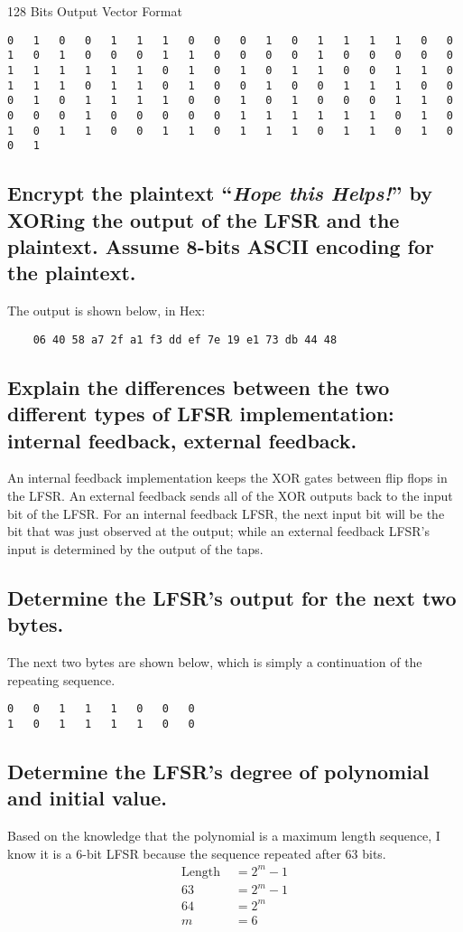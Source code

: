 \documentclass{article}
\begin{document}
\begin{table}[H]
   \centering
   \caption{128 Bits Output Vector Format}
   \begin{verbatim}
0	1	0	0	1	1	1	0	0	0	1	0	1	1	1	1	0	0	1	0	1	0	0	0	1	1	0	0	0	0	1	0	0	0	0	0	1	1	1	1	1	1	0	1	0	1	0	1	1	0	0	1	1	0	1	1	1	0	1	1	0	1	0	0	1	0	0	1	1	1	0	0	0	1	0	1	1	1	1	0	0	1	0	1	0	0	0	1	1	0	0	0	0	1	0	0	0	0	0	1	1	1	1	1	1	0	1	0	1	0	1	1	0	0	1	1	0	1	1	1	0	1	1	0	1	0	0	1
   \end{verbatim} 
\end{table}
\subsection*{Encrypt the plaintext ``\textit{Hope this Helps!}'' by XORing the output of the LFSR and the plaintext. Assume 8-bits ASCII encoding for the plaintext.}
The output is shown below, in Hex:

	\begin{verbatim}
	06 40 58 a7 2f a1 f3 dd ef 7e 19 e1 73 db 44 48
	\end{verbatim}
\newpage
\subsection*{Explain the differences between the two different types of LFSR implementation: internal feedback, external feedback.}

An internal feedback implementation keeps the XOR gates between flip flops in the LFSR.
An external feedback sends all of the XOR outputs back to the input bit of the LFSR.
For an internal feedback LFSR, the next input bit will be the bit that was just observed at the output; while an external feedback LFSR's input is determined by the output of the taps.

\subsection*{Determine the LFSR's output for the next two bytes.}
The next two bytes are shown below, which is simply a continuation of the repeating sequence.

\begin{verbatim}
0	0	1	1	1	0	0	0
1	0	1	1	1	1	0	0
\end{verbatim}

\subsection*{Determine the LFSR's degree of polynomial and initial value.}
Based on the knowledge that the polynomial is a maximum length sequence, I know it is a 6-bit LFSR because the sequence repeated after 63 bits.
\begin{align*}
\text{Length } &= 2^m - 1 \\
		63 		&= 2^m - 1 \\
		64		&= 2^m \\
		m		&= 6
\end{align*}
\end{document}
